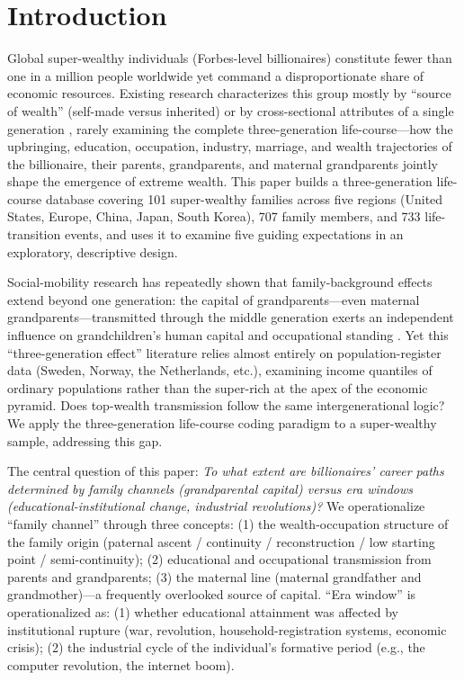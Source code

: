\documentclass[11pt,a4paper]{article}
\begin{document}
\section{Introduction}
\label{sec:intro}

Global super-wealthy individuals (Forbes-level billionaires) constitute fewer than one in a million people worldwide yet command a disproportionate share of economic resources. Existing research characterizes this group mostly by ``source of wealth'' (self-made versus inherited) \citep{kaplan2013,lillie2025,iza2026} or by cross-sectional attributes of a single generation \citep{lu2021,korom2017}, rarely examining the complete three-generation life-course---how the upbringing, education, occupation, industry, marriage, and wealth trajectories of the billionaire, their parents, grandparents, and maternal grandparents jointly shape the emergence of extreme wealth. This paper builds a three-generation life-course database covering 101 super-wealthy families across five regions (United States, Europe, China, Japan, South Korea), 707 family members, and 733 life-transition events, and uses it to examine five guiding expectations in an exploratory, descriptive design.

Social-mobility research has repeatedly shown that family-background effects extend beyond one generation: the capital of grandparents---even maternal grandparents---transmitted through the middle generation exerts an independent influence on grandchildren's human capital and occupational standing \citep{anderson2018,hallsten2023}. Yet this ``three-generation effect'' literature relies almost entirely on population-register data (Sweden, Norway, the Netherlands, etc.), examining income quantiles of ordinary populations rather than the super-rich at the apex of the economic pyramid. Does top-wealth transmission follow the same intergenerational logic? We apply the three-generation life-course coding paradigm to a super-wealthy sample, addressing this gap.

The central question of this paper: \emph{To what extent are billionaires' career paths determined by family channels (grandparental capital) versus era windows (educational-institutional change, industrial revolutions)?} We operationalize ``family channel'' through three concepts: (1) the wealth-occupation structure of the family origin (paternal ascent / continuity / reconstruction / low starting point / semi-continuity); (2) educational and occupational transmission from parents and grandparents; (3) the maternal line (maternal grandfather and grandmother)---a frequently overlooked source of capital. ``Era window'' is operationalized as: (1) whether educational attainment was affected by institutional rupture (war, revolution, household-registration systems, economic crisis); (2) the industrial cycle of the individual's formative period (e.g., the computer revolution, the internet boom).
\end{document}

